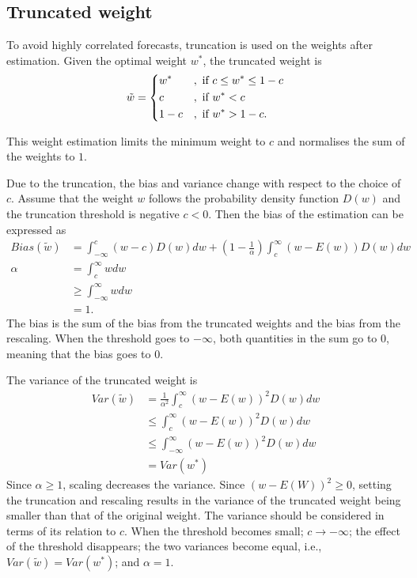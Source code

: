 \documentclass[11pt]{article}
\begin{document}
	\subsection{Truncated weight}\label{truncated-weight}
	
	To avoid highly correlated forecasts, truncation is used on the
	weights after estimation. Given the optimal weight $w^*$, the truncated weight is 
	\begin{equation}
	\label{eqn: w trunc}
	\tilde{w} = 
	\begin{dcases}
	w^* &, \text{ if } c\leq w^*\leq 1-c \\
	c &, \text{ if } w^*<c \\
	1-c &, \text{ if } w^*>1-c.
	\end{dcases}
	\end{equation}
	
	This weight estimation limits the minimum weight to $c$ and normalises the sum of the weights to $1$. 
	
	Due to the truncation, the bias and variance change with respect to the choice of $c$. Assume that the weight $w$ follows the probability density function $D(w)$ and the truncation threshold is negative $c<0$. Then the bias of the estimation can be expressed as
	\begin{equation}
	\label{eqn: bias trunc}
	\begin{aligned}
	Bias(\tilde{w}) &= \int_{-\infty}^{c} (w-c) D(w)dw + (1-\frac{1}{\alpha})\int_{c}^{\infty}( w-E(w))D(w)dw\\
	\alpha &= \int_{c}^{\infty} w dw\\
	&\geq \int_{-\infty}^{\infty} w dw\\
	&=1.
	\end{aligned}
	\end{equation}
	The bias is the sum of the bias from the truncated weights and the bias from the rescaling. When the threshold goes to $-\infty$, both quantities in the sum go to $0$, meaning that the bias goes to $0$.
	
	The variance of the truncated weight is
	\begin{equation}
	\label{eqn: var trunc}
	\begin{aligned}
	Var(\tilde{w}) &= \frac{1}{\alpha^2} \int_{c}^{\infty} (w-E(w))^2 D(w) dw\\
	&\leq \int_{c}^{\infty} (w-E(w))^2 D(w) dw\\
	&\leq \int_{-\infty}^{\infty} (w-E(w))^2 D(w) dw\\
	&=Var(w^*)
	\end{aligned}
	\end{equation}
	Since $\alpha \geq 1$,  scaling decreases the variance. Since $(w-E(W))^2 \geq 0$, setting the truncation and rescaling results in the variance of the truncated weight being smaller than that of the original weight. The variance should be considered in terms of its relation to $c$. When the threshold becomes small; $c \rightarrow -\infty$; the effect of the threshold disappears; the two variances become equal, i.e., $Var(\tilde{w}) = Var(w^*)$; and $\alpha = 1$.
	
\end{document}
